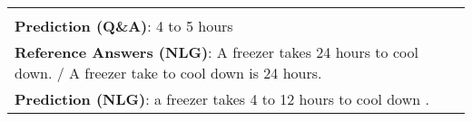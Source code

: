 \documentclass[11pt,a4paper]{article}
\newcommand{\xmark}{\ding{55}}%
\theoremstyle{mydef}
\theoremstyle{myprob}
\begin{document}
\begin{table*}[h!]
{\begin{tabular}{p{50em}}
{%
\textbf{Reference Answer (Q\&A)}: 24 hours\\
\textbf{Prediction (Q\&A)}: 4 to 5 hours \xmark \\
\textbf{Reference Answers (NLG)}: A freezer takes 24 hours to cool down. / A  freezer take to cool down is 24 hours.\\
\textbf{Prediction (NLG)}: a freezer takes 4 to 12 hours to cool down . \xmark
}
\vspace{1pt}
\\ \hline
\end{tabular}
}
\end{table*}
\end{document}
